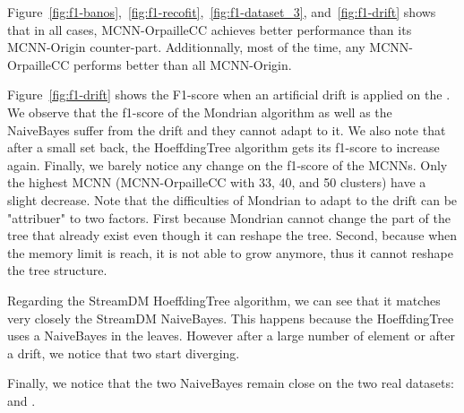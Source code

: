 Figure~\ref{fig:f1-banos},~\ref{fig:f1-recofit},~\ref{fig:f1-dataset_3},
and~\ref{fig:f1-drift} shows that in all cases, MCNN-OrpailleCC achieves
better performance than its MCNN-Origin counter-part. Additionnally, most of
the time, any MCNN-OrpailleCC performs better than all MCNN-Origin.

Figure~\ref{fig:f1-drift} shows the F1-score when an artificial drift is
applied on the \banosdataset. We observe that the f1-score of the Mondrian
algorithm as well as the NaiveBayes suffer from the drift and they cannot adapt
to it. We also note that after a small set back, the HoeffdingTree algorithm
gets its f1-score to increase again. Finally, we barely notice any change on
the f1-score of the MCNNs. Only the highest MCNN (MCNN-OrpailleCC with 33, 40,
and 50 clusters) have a slight decrease.
Note that the difficulties of Mondrian to adapt to the drift can be "attribuer"
to two factors. First because Mondrian cannot change the part of the tree that
already exist even though it can reshape the tree. Second, because when the
memory limit is reach, it is not able to grow anymore, thus it cannot reshape
the tree structure.

Regarding the StreamDM HoeffdingTree algorithm, we can see that it matches very
closely the StreamDM NaiveBayes. This happens because the HoeffdingTree uses a
NaiveBayes in the leaves. However after a large number of element or after a
drift, we notice that two start diverging.

Finally, we notice that the two NaiveBayes remain close on the two real
datasets: \banosdataset and \recofitdataset.


